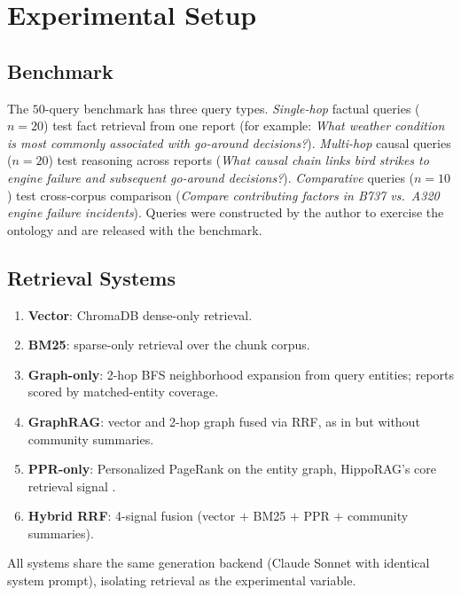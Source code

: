 \documentclass[10pt,a4paper]{article}
\begin{document}
\section{Experimental Setup}
\label{sec:setup}

\subsection{Benchmark}

The $50$-query benchmark has three query types. \emph{Single-hop}
factual queries ($n=20$) test fact retrieval from one report (for
example: \emph{What weather condition is most commonly associated
with go-around decisions?}). \emph{Multi-hop} causal queries
($n=20$) test reasoning across reports (\emph{What causal chain links
bird strikes to engine failure and subsequent go-around decisions?}).
\emph{Comparative} queries ($n=10$) test cross-corpus comparison
(\emph{Compare contributing factors in B737 vs.~A320 engine failure
incidents}). Queries were constructed by the author to exercise the
ontology and are released with the benchmark.

\subsection{Retrieval Systems}

\begin{enumerate}[leftmargin=1.2em,itemsep=1pt,topsep=1pt]
\item \textbf{Vector}: ChromaDB dense-only retrieval.
\item \textbf{BM25}: sparse-only retrieval over the chunk corpus.
\item \textbf{Graph-only}: 2-hop BFS neighborhood expansion from
query entities; reports scored by matched-entity coverage.
\item \textbf{GraphRAG}: vector and 2-hop graph fused via RRF, as in
\citet{edge2024graphrag} but without community summaries.
\item \textbf{PPR-only}: Personalized PageRank on the entity graph,
HippoRAG's core retrieval signal \citep{gutierrez2024hipporag}.
\item \textbf{Hybrid RRF}: 4-signal fusion
(vector $+$ BM25 $+$ PPR $+$ community summaries).
\end{enumerate}
All systems share the same generation backend (Claude Sonnet with
identical system prompt), isolating retrieval as the experimental
variable.
\end{document}
